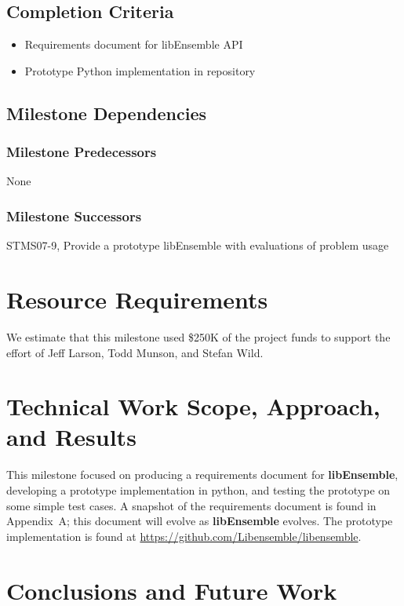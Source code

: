 \documentclass{ecpreport}
\begin{document}
\subsection{Completion Criteria}

\begin{itemize}
\item Requirements document for libEnsemble API
\item Prototype Python implementation in repository
\end{itemize}

\subsection{Milestone Dependencies}
\subsubsection{Milestone Predecessors}

None

\subsubsection{Milestone Successors}

STMS07-9, Provide a prototype libEnsemble with evaluations of problem usage

\section{Resource Requirements}

We estimate that this milestone used \$250K of the project funds to support
the effort of Jeff Larson, Todd Munson, and Stefan Wild.

\section{Technical Work Scope, Approach, and Results}

This milestone focused on producing a requirements document for {\bf libEnsemble},
developing a prototype implementation in python, and testing the prototype on
some simple test cases.  A snapshot of the requirements document is found
in Appendix~A; this document will evolve as {\bf libEnsemble} evolves.
The prototype implementation is found at 
\url{https://github.com/Libensemble/libensemble}.

\section{Conclusions and Future Work}
\end{document}
